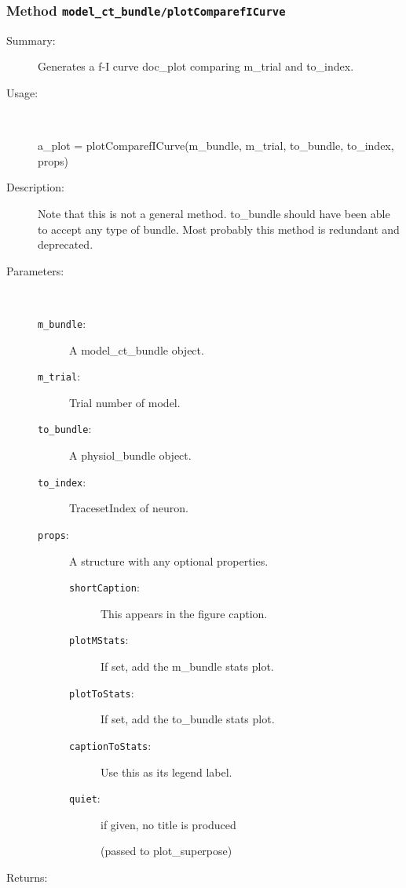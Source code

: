 \subsubsection[Method \texttt{plotComparefICurve}]{Method \texttt{model\_ct\_bundle/plotComparefICurve}}%
%
\label{ref_model_ct_bundle__plotComparefICurve}%
\hypertarget{ref_model_ct_bundle__plotComparefICurve}{}%
\begin{description}
\item[Summary:]Generates a f-I curve doc\_plot comparing m\_trial and to\_index.
%
\item[Usage:]~%
\begin{lyxcode}%
a\_plot = plotComparefICurve(m\_bundle, m\_trial, to\_bundle, to\_index, props)
%
\end{lyxcode}%
%
\item[Description:]%
Note that this is not a general method. to\_bundle should have been able to accept
 any type of bundle. Most probably this method is redundant and deprecated.
\item[Parameters:]~
\begin{description}%
\item[\texttt{m\_bundle}:]
 A model\_ct\_bundle object.
\item[\texttt{m\_trial}:]
 Trial number of model.
\item[\texttt{to\_bundle}:]
 A physiol\_bundle object.
\item[\texttt{to\_index}:]
 TracesetIndex of neuron.
\item[\texttt{props}:]
 A structure with any optional properties.
\begin{description}%
\item[\texttt{shortCaption}:]
 This appears in the figure caption.
\item[\texttt{plotMStats}:]
 If set, add the m\_bundle stats plot.
\item[\texttt{plotToStats}:]
 If set, add the to\_bundle stats plot.
\item[\texttt{captionToStats}:]
 Use this as its legend label. 
\item[\texttt{quiet}:]
 if given, no title is produced

(passed to plot\_superpose)\end{description}%
\end{description}%
%
\item[Returns:]~


\end{description}
